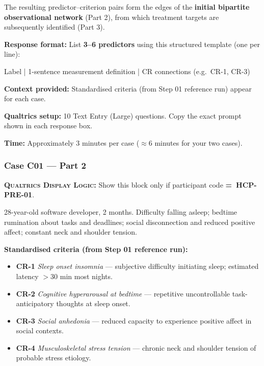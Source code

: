 \documentclass[11pt,a4paper]{article}
\newcommand{\dlnote}[1]{\par\vspace{0.15em}\noindent\begin{tcolorbox}[colback=AccentAmber,colframe=GoldAmber,boxrule=0.45pt,arc=1mm,left=5pt,right=5pt,top=2.5pt,bottom=2.5pt]\footnotesize\textbf{\color{GoldAmber}\scshape Qualtrics Display Logic:} Show this block only if participant code \textbf{=~#1}.\end{tcolorbox}\vspace{0.1em}}
\begin{document}
\begin{tcolorbox}[colback=PartTwoBG,colframe=ForestGreen,arc=2.5mm,boxrule=0.9pt,left=10pt,right=10pt,top=9pt,bottom=9pt]
The resulting predictor--criterion pairs form the edges of the \textbf{initial bipartite observational network} (Part 2), from which treatment targets are subsequently identified (Part 3).

\textbf{Response format:} List \textbf{3--6 predictors} using this structured template (one per line):

\begin{center}\small\ttfamily
Label | 1-sentence measurement definition | CR connections (e.g.\ CR-1, CR-3)
\end{center}

\textbf{Context provided:} Standardised criteria (from Step 01 reference run) appear for each case.

\textbf{Qualtrics setup:} 10 Text Entry (Large) questions. Copy the exact prompt shown in each response box.

\textbf{Time:} Approximately 3 minutes per case ($\approx$6 minutes for your two cases).
\end{tcolorbox}

\vspace{0.5em}

\subsubsection*{Case C01 --- Part 2}
\dlnote{HCP-PRE-01}

\begin{complaintbox}[title=Case C01 --- Complaint (abbreviated)]
\small 28-year-old software developer, 2 months. Difficulty falling asleep; bedtime rumination about tasks and deadlines; social disconnection and reduced positive affect; constant neck and shoulder tension.
\end{complaintbox}

\begin{contextbox}
\small\textbf{Standardised criteria (from Step 01 reference run):}
\begin{itemize}[topsep=2pt,itemsep=1pt]
\item \textbf{CR-1} \textit{Sleep onset insomnia} --- subjective difficulty initiating sleep; estimated latency $>$30 min most nights.
\item \textbf{CR-2} \textit{Cognitive hyperarousal at bedtime} --- repetitive uncontrollable task-anticipatory thoughts at sleep onset.
\item \textbf{CR-3} \textit{Social anhedonia} --- reduced capacity to experience positive affect in social contexts.
\item \textbf{CR-4} \textit{Musculoskeletal stress tension} --- chronic neck and shoulder tension of probable stress etiology.
\end{itemize}
\end{contextbox}
\end{document}
